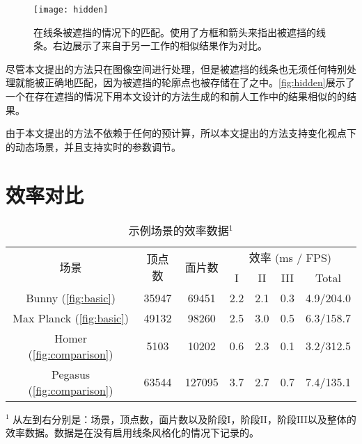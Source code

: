 \begin{figure}[tbh]
    \centering
    \texttt{[image: hidden]}
    \caption{\label{fig:hidden}
    在线条被遮挡的情况下的匹配。使用了方框和箭头来指出被遮挡的线条。右边展示了来自于另一工作\cite{bukenberger2018stereo}的相似结果作为对比。}
\end{figure}

尽管本文提出的方法只在图像空间进行处理，但是被遮挡的线条也无须任何特别处理就能被正确地匹配，因为被遮挡的轮廓点也被存储在了\ppll{}之中。\autoref{fig:hidden}展示了一个在存在遮挡的情况下用本文设计的方法生成的和前人工作中的结果相似的的结果。

由于本文提出的方法不依赖于任何的预计算，所以本文提出的方法支持变化视点下的动态场景，并且支持实时的参数调节。

\section{效率对比}

\begin{table}[tbh]
    \renewcommand{\arraystretch}{1.3}
    \centering
  \begin{threeparttable}
    \caption{示例场景的效率数据$^1$}
    \label{tab:performance}
    \centering
    \begin{tabular}{c|cc|ccc|c}
    \hline
    \multirow{2}{*}{场景} & \multirow{2}{*}{顶点数} & \multirow{2}{*}{面片数} & \multicolumn{4}{c}{效率 (ms / FPS)} \\
    \cline{4-7}
    & & & I & II & III & Total \\
    \hline
    Bunny (\autoref{fig:basic}) & 35947 & 69451 & {2.2} & {2.1} & {0.3} & {4.9/204.0} \\
    Max Planck (\autoref{fig:basic}) & 49132 & 98260 & {2.5} & {3.0} & {0.5} & {6.3/158.7} \\
    Homer (\autoref{fig:comparison}) & 5103 & 10202 & {0.6} & {2.3} & {0.1} & {3.2/312.5} \\
    Pegasus (\autoref{fig:comparison}) & 63544 & 127095 & {3.7} & {2.7} & {0.7} & {7.4/135.1} \\
    \hline
    \end{tabular}
    \begin{tablenotes}
      \item $^1$ 从左到右分别是：场景，顶点数，面片数以及阶段I，阶段II，阶段III以及整体的效率数据。数据是在没有启用线条风格化的情况下记录的。
    \end{tablenotes}
  \end{threeparttable}
\end{table}

